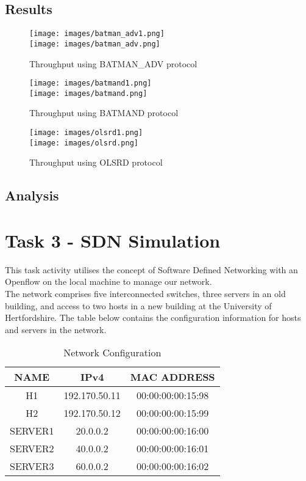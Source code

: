 \documentclass{article}
\begin{document}
\subsection{Results}
    \begin{figure}[h]
        \centering
        \texttt{[image: images/batman\_adv1.png]} \\
        \texttt{[image: images/batman\_adv.png]}
        \caption{Throughput using BATMAN\_ADV protocol}
        \label{fig:adhocProto}
    \end{figure}
    \begin{figure}[h]
        \centering
        \texttt{[image: images/batmand1.png]} \\
        \texttt{[image: images/batmand.png]}
        \caption{Throughput using BATMAND protocol}
        \label{fig:adhocProto}
    \end{figure}
    \begin{figure}[h]
        \centering
        \texttt{[image: images/olsrd1.png]} \\
        \texttt{[image: images/olsrd.png]}
        \caption{Throughput using OLSRD protocol}
        \label{fig:adhocProto}
    \end{figure}
\subsection{Analysis}

\newpage
\section{Task 3 - SDN Simulation}
    This task activity utilises the concept of Software Defined Networking with an Openflow on the local machine to manage our network. \\The network comprises five interconnected switches, three servers in an old building, and access to two hosts in a new building at the University of Hertfordshire. The table below contains the configuration information for hosts and servers in the network.
    \begin{table}[h]
        \centering
        \begin{tabular}{|c|c|c|}
            \hline
            NAME & IPv4 & MAC ADDRESS \\
            \hline
            H1 & 192.170.50.11 & 00:00:00:00:15:98 \\
            H2 & 192.170.50.12 & 00:00:00:00:15:99 \\
            SERVER1 & 20.0.0.2 & 00:00:00:00:16:00 \\
            SERVER2 & 40.0.0.2 & 00:00:00:00:16:01 \\
            SERVER3 & 60.0.0.2 & 00:00:00:00:16:02 \\
            \hline
        \end{tabular}
        \caption{Network Configuration}
        \label{tab:4}
    \end{table}
\end{document}
